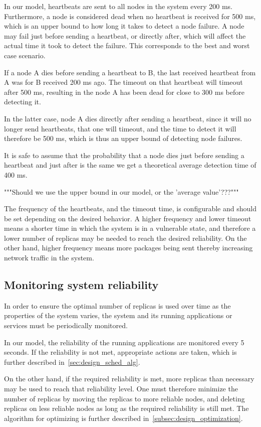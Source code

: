 \documentclass{cslthse-msc}
\begin{document}
In our model, heartbeats are sent to all nodes in the system every 200 ms. Furthermore, a node is considered dead when no heartbeat is received for 500 ms, which is an upper bound to how long it takes to detect a node failure. A node may fail just before sending a heartbeat, or directly after, which will affect the actual time it took to detect the failure. This corresponds to the best and worst case scenario. 

If a node A dies before sending a heartbeat to B, the last received heartbeat from A was for B received 200 ms ago. The timeout on that heartbeat will timeout after 500 ms, resulting in the node A has been dead for close to 300 ms before detecting it. 

In the latter case, node A dies directly after sending a heartbeat, since it will no longer send heartbeats, that one will timeout, and the time to detect it will therefore be 500 ms, which is thus an upper bound of detecting node failures.

It is safe to assume that the probability that a node dies just before sending a heartbeat and just after is the same we get a theoretical average detection time of 400 ms.

"""Should we use the upper bound in our model, or the 'average value'???"""

The frequency of the heartbeats, and the timeout time, is configurable and should be set depending on the desired behavior. A higher frequency and lower timeout means a shorter time in which the system is in a vulnerable state, and therefore a lower number of replicas may be needed to reach the desired reliability. On the other hand, higher frequency means more packages being sent thereby increasing network traffic in the system.

\subsection{Monitoring system reliability} \label{subsec:monitoring_system_rel}
In order to ensure the optimal number of replicas is used over time as the properties of the system varies, the system and its running applications or services must be periodically monitored. 

In our model, the reliability of the running applications are monitored every 5 seconds. If the reliability is not met, appropriate actions are taken, which is further described in~\cref{sec:design_sched_alg}.

On the other hand, if the required reliability is met, more replicas than necessary may be used to reach that reliability level. One must therefore minimize the number of replicas by moving the replicas to more reliable nodes, and deleting replicas on less reliable nodes as long as the required reliability is still met. The algorithm for optimizing is further described in~\cref{subsec:design_optimization}.
\end{document}
